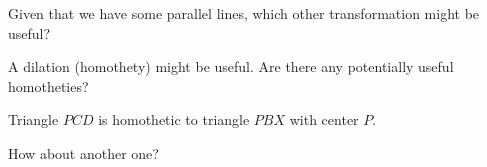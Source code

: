 Given that we have some parallel lines, which other transformation might be useful?











A dilation (homothety) might be useful.  Are there any potentially useful homotheties?







Triangle $PCD$ is homothetic to triangle $PBX$ with center $P.$

How about another one?

